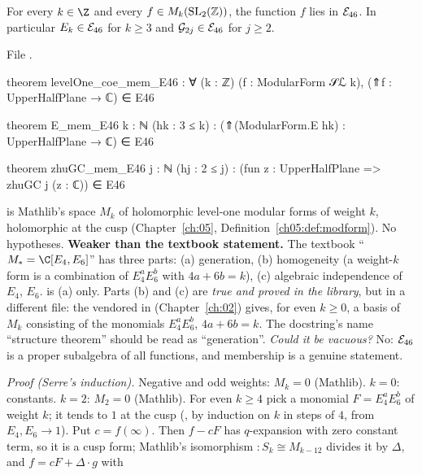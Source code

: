 \begin{theorem}\label{l14:thm:levelone}
For every $k\in\Z$ and every $f\in M_k(\mathrm{SL}_2(\mathbb{Z}))$, the function $f$ lies in $\mathcal{E}_{46}$. In particular $E_k\in\mathcal{E}_{46}$
for $k\ge3$ and $\mathcal G_{2j}\in\mathcal{E}_{46}$ for $j\ge2$.
\end{theorem}
\noindent File .
\begin{leancode}
theorem levelOne_coe_mem_E46 : ∀ (k : ℤ) (f : ModularForm 𝒮ℒ k),
    (⇑f : UpperHalfPlane → ℂ) ∈ E46

theorem E_mem_E46 {k : ℕ} (hk : 3 ≤ k) :
    (⇑(ModularForm.E hk) : UpperHalfPlane → ℂ) ∈ E46

theorem zhuGC_mem_E46 {j : ℕ} (hj : 2 ≤ j) :
    (fun z : UpperHalfPlane => zhuGC j (z : ℂ)) ∈ E46
\end{leancode}
\begin{dictionary}
 is Mathlib's space $M_k$ of holomorphic level-one modular forms of weight $k$, holomorphic at the cusp
(Chapter~\ref{ch:05}, Definition~\ref{ch05:def:modform}). No hypotheses. \textbf{Weaker than the textbook statement.} The
textbook ``$M_* = \C[E_4,E_6]$'' has three parts: (a) generation, (b) homogeneity (a weight-$k$ form is a combination of
$E_4^aE_6^b$ with $4a+6b=k$), (c) algebraic independence of $E_4$, $E_6$.  is (a) only. Parts (b)
and (c) are \emph{true and proved in the library}, but in a different file: the vendored
 in 
(Chapter~\ref{ch:02}) gives, for even $k\ge0$, a basis of $M_k$ consisting of the monomials $E_4^aE_6^b$, $4a+6b=k$. The
docstring's name ``structure theorem'' should be read as ``generation''. \emph{Could it be vacuous?} No: $\mathcal{E}_{46}$ is a
proper subalgebra of all functions, and membership is a genuine statement.
\end{dictionary}
\noindent\emph{Proof (Serre's induction).} Negative and odd weights: $M_k = 0$ (Mathlib). $k=0$: constants. $k=2$: $M_2 = 0$
(Mathlib). For even $k\ge4$ pick a monomial $F = E_4^aE_6^b$ of weight $k$; it tends to $1$ at the cusp
(, by induction on $k$ in steps of $4$, from $E_4,E_6\to1$). Put $c = f(\infty)$. Then
$f - cF$ has $q$-expansion with zero constant term, so it is a cusp form; Mathlib's isomorphism
 $:S_k\cong M_{k-12}$ divides it by $\Delta$, and $f = cF + \Delta\cdot g$ with
